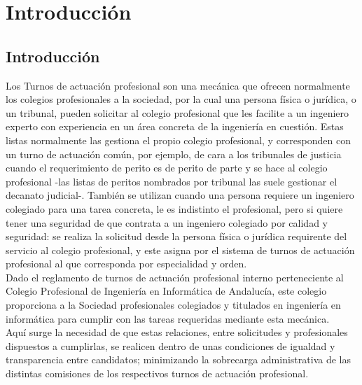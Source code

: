 \documentclass[12pt,a4paper,spanish]{book}
\newcounter{ri}
\begin{document}
\frontmatter

\tableofcontents


\mainmatter
\chapter{Introducción}

\section{Introducción}

Los Turnos de actuación profesional son una mecánica que ofrecen normalmente los colegios profesionales a la sociedad, por la cual una persona física o jurídica, o un tribunal, pueden solicitar al colegio profesional que les facilite a un ingeniero experto con experiencia en un área concreta de la ingeniería en cuestión. Estas listas normalmente las gestiona el propio colegio profesional, y corresponden con un turno de actuación común, por ejemplo, de cara a los tribunales de justicia cuando el requerimiento de perito es de perito de parte y se hace al colegio profesional -las listas de peritos nombrados por tribunal las suele gestionar el decanato judicial-. También se utilizan cuando una persona requiere un ingeniero colegiado para una tarea concreta, le es indistinto el profesional, pero si quiere tener una seguridad de que contrata a un ingeniero colegiado por calidad y seguridad: se realiza la solicitud desde la persona física o jurídica requirente del servicio al colegio profesional, y este asigna por el sistema de turnos de actuación profesional al que corresponda por especialidad y orden. \\

Dado el reglamento de turnos de actuación profesional interno perteneciente al Colegio Profesional de Ingeniería en Informática de Andalucía, este colegio proporciona a la Sociedad profesionales colegiados y titulados en ingeniería en informática para cumplir con las tareas requeridas mediante esta mecánica. \\

Aquí surge la necesidad de que estas relaciones, entre solicitudes y profesionales dispuestos a cumplirlas, se realicen dentro de unas condiciones de igualdad y transparencia entre candidatos; minimizando la sobrecarga administrativa de las distintas comisiones de los respectivos turnos de actuación profesional.
\end{document}
